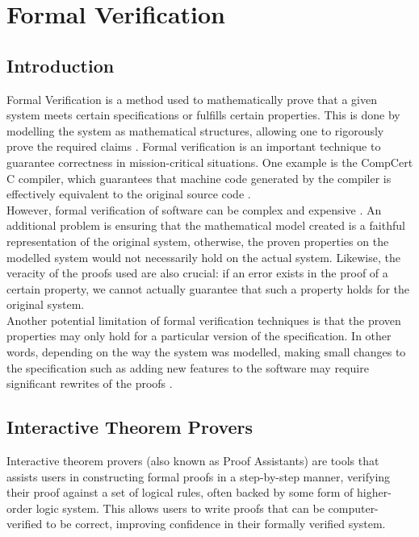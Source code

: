 \section{Formal Verification}
\subsection{Introduction}
Formal Verification is a method used to mathematically prove that a given system meets certain specifications or fulfills certain properties. This is done by modelling the system as mathematical structures, allowing one to rigorously prove the required claims \cite{fvdefn}. Formal verification is an important technique to guarantee correctness in mission-critical situations. One example is the CompCert C compiler, which guarantees that machine code generated by the compiler is effectively equivalent to the original source code \cite{compcert}.
\\

However, formal verification of software can be complex and expensive \cite{fv-disc}. An additional problem is ensuring that the mathematical model created is a faithful representation of the original system, otherwise, the proven properties on the modelled system would not necessarily hold on the actual system. Likewise, the veracity of the proofs used are also crucial: if an error exists in the proof of a certain property, we cannot actually guarantee that such a property holds for the original system.
\\

Another potential limitation of formal verification techniques is that the proven properties may only hold for a particular version of the specification. In other words, depending on the way the system was modelled, making small changes to the specification such as adding new features to the software may require significant rewrites of the proofs \cite{fv-drift}.
\\

\subsection{Interactive Theorem Provers}
Interactive theorem provers (also known as Proof Assistants) are tools that assists users in constructing formal proofs in a step-by-step manner, verifying their proof against a set of logical rules, often backed by some form of higher-order logic system. This allows users to write proofs that can be computer-verified to be correct, improving confidence in their formally verified system.
\\

